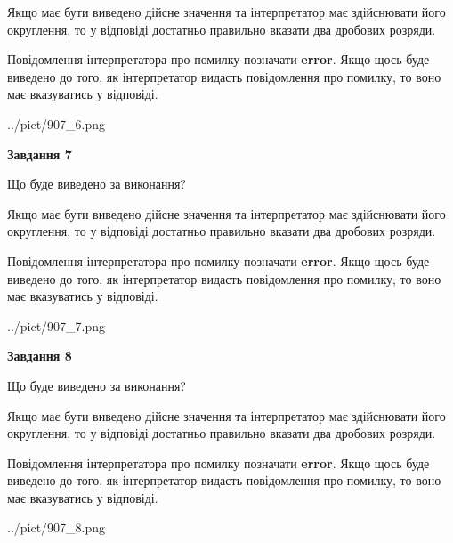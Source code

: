 \documentclass[12pt, ukrainian]{article}
\begin{document}
{\begin {Large}
Якщо має бути виведено дійсне значення та інтерпретатор має здійснювати його округлення, 
то у відповіді достатньо правильно вказати два дробових розряди.

Повідомлення інтерпретатора про помилку позначати \textbf{error}.
Якщо щось буде виведено до того, як інтерпретатор видасть повідомлення про помилку, 
то воно має вказуватись у відповіді. \par

\begin{center}
	{../pict/907_6.png}
\end{center}
\newpage

{\begin {center}\textbf{Завдання 7}\end {center}}\par
Що буде виведено за виконання? \par

Якщо має бути виведено дійсне значення та інтерпретатор має здійснювати його округлення, 
то у відповіді достатньо правильно вказати два дробових розряди.

Повідомлення інтерпретатора про помилку позначати \textbf{error}.
Якщо щось буде виведено до того, як інтерпретатор видасть повідомлення про помилку, 
то воно має вказуватись у відповіді. \par

\begin{center}
	{../pict/907_7.png}
\end{center}
\newpage

{\begin {center}\textbf{Завдання 8}\end {center}}\par
Що буде виведено за виконання? \par

Якщо має бути виведено дійсне значення та інтерпретатор має здійснювати його округлення, 
то у відповіді достатньо правильно вказати два дробових розряди.

Повідомлення інтерпретатора про помилку позначати \textbf{error}.
Якщо щось буде виведено до того, як інтерпретатор видасть повідомлення про помилку, 
то воно має вказуватись у відповіді. \par

\begin{center}
	{../pict/907_8.png}
\end{center}
\newpage


\end{Large}}
\end{document}
